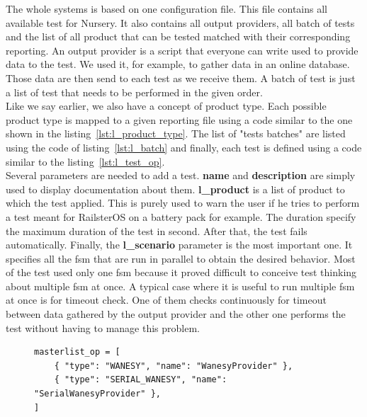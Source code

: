 \documentclass[12pt]{article}
\theoremstyle{definition}
\theoremstyle{definition}
\theoremstyle{remark}
\begin{document}
The whole systems is based on one configuration file. This file contains all available test for Nursery. It also contains all output providers, all batch of tests and the list of all product that can be tested matched with their corresponding reporting. An output provider is a script that everyone can write used to provide data to the test. We used it, for example, to gather data in an online database. Those data are then send to each test as we receive them. A batch of test is just a list of test that needs to be performed in the given order.\\

Like we say earlier, we also have a concept of product type. Each possible product type is mapped to a given reporting file using a code similar to the one shown in the listing~\ref{lst:l_product_type}. The list of "tests batches" are listed using the code of listing~\ref{lst:l_batch} and finally, each test is defined using a code similar to the listing~\ref{lst:l_test_op}.\\

Several parameters are needed to add a test. \textbf{name} and \textbf{description} are simply used to display documentation about them. \textbf{l\_product} is a list of product to which the test applied. This is purely used to warn the user if he tries to perform a test meant for RailsterOS on a battery pack for example. The duration specify the maximum duration of the test in second. After that, the test fails automatically. Finally, the \textbf{l\_scenario} parameter is the most important one. It specifies all the \gls{fsm} that are run in parallel to obtain the desired behavior. Most of the test used only one \gls{fsm} because it proved difficult to conceive test thinking about multiple \gls{fsm} at once. A typical case where it is useful to run multiple \gls{fsm} at once is for timeout check. One of them checks continuously for timeout between data gathered by the output provider and the other one performs the test without having to manage this problem.\\

\begin{figure}
    \label{masterlist_op}
    \begin{lstlisting}[caption="Output provider configuration",label={lst:masterlist_op}]
masterlist_op = [
    { "type": "WANESY", "name": "WanesyProvider" },
    { "type": "SERIAL_WANESY", "name": "SerialWanesyProvider" },
]
    \end{lstlisting}
\end{figure}
\end{document}
